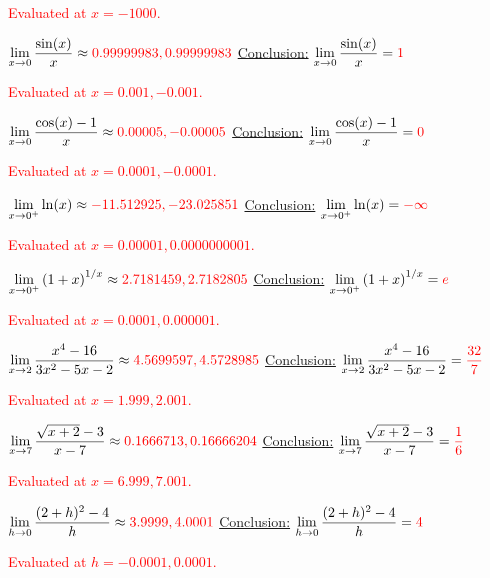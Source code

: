 \documentclass[]{exam}
\numberwithin{equation}{section}
\begin{document}
\begin{questions}
\begin{parts}
\begin{subparts}
	\textcolor{red}{Evaluated at $x = -1000$. }\vfill


	\pagebreak

	\subpart $\displaystyle \lim_{x\to 0} \frac{\sin(x)}{x}\approx\textcolor{red}{0.99999983, 0.99999983}$  \underline{Conclusion:} $\displaystyle \lim_{x\to 0} \frac{\sin(x)}{x}= \textcolor{red}{1}$ 

	\textcolor{red}{Evaluated at $x = 0.001, -0.001$. }\vfill

	\subpart $\displaystyle \lim_{x\to 0} \frac{\cos(x)-1}{x}\approx\textcolor{red}{0.00005, -0.00005}$  \underline{Conclusion:} $\displaystyle \lim_{x\to 0} \frac{\cos(x)-1}{x}=\textcolor{red}{0} $

	\textcolor{red}{Evaluated at $x = 0.0001, -0.0001$. }\vfill
	
	\subpart $\displaystyle \lim_{x\to 0^+} \ln(x)\approx\textcolor{red}{-11.512925, -23.025851}$  \underline{Conclusion:} $\displaystyle \lim_{x\to 0^+}  \ln(x) =\textcolor{red}{-\infty} $
	
	\textcolor{red}{Evaluated at $x = 0.00001, 0.0000000001 $. }\vfill
	
	\subpart $\displaystyle \lim_{x\to 0^+} \left(1 + x\right)^{1/x}\approx\textcolor{red}{2.7181459, 2.7182805}$  \underline{Conclusion:} $\displaystyle \lim_{x\to 0^+} \left(1 + x\right)^{1/x} =\textcolor{red}{e}$
	
	\textcolor{red}{Evaluated at $x = 0.0001, 0.000001$. }\vfill
	
	\subpart $\displaystyle \lim_{x\to 2} \frac{x^4 - 16}{3x^2 - 5x - 2}\approx\textcolor{red}{4.5699597, 4.5728985}$  \underline{Conclusion:} $\displaystyle \lim_{x\to 2}\frac{x^4 - 16}{3x^2 - 5x - 2}=\textcolor{red}{\frac{32}{7}} $
	
	\textcolor{red}{Evaluated at $x = 1.999, 2.001$. }\vfill

		\subpart $\displaystyle \lim_{x\to 7} \frac{\sqrt{x+2} - 3}{x-7}\approx\textcolor{red}{0.1666713, 0.16666204}$  \underline{Conclusion:} $\displaystyle  \lim_{x\to 7} \frac{\sqrt{x+2} - 3}{x-7}=\textcolor{red}{\frac{1}{6}} $ 
		
	\textcolor{red}{Evaluated at $x = 6.999, 7.001$. }\vfill

		
		\subpart $\displaystyle  \lim_{h\to 0} \frac{ (2 + h)^2 - 4}{h}\approx\textcolor{red}{3.9999, 4.0001}$  \underline{Conclusion:} $\displaystyle  \lim_{h\to 0} \frac{ (2 + h)^2 - 4}{h}=\textcolor{red}{4}$
		
	\textcolor{red}{Evaluated at $h = -0.0001, 0.0001$. }\vfill

				

	
\end{subparts}


\end{parts}



\pagebreak







\end{questions}
\end{document}
